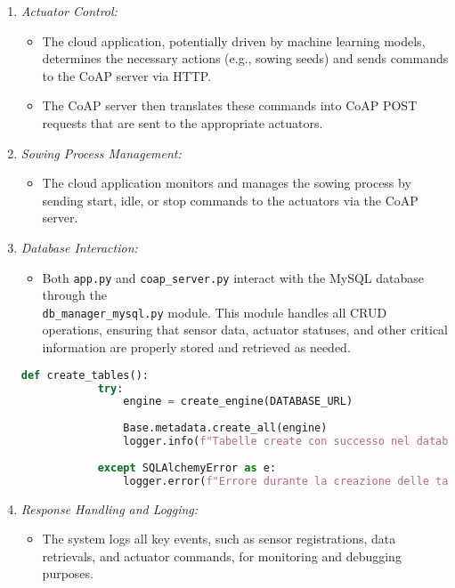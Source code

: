 \begin{enumerate}
    \item \textit{Actuator Control:} 
    \begin{itemize}
        \item The cloud application, potentially driven by machine learning models, determines the necessary actions (e.g., sowing seeds) and sends commands to the CoAP server via HTTP.
        \item The CoAP server then translates these commands into CoAP POST requests that are sent to the appropriate actuators. 
    \end{itemize}
    
    \item \textit{Sowing Process Management:} 
    \begin{itemize}
        \item The cloud application monitors and manages the sowing process by sending start, idle, or stop commands to the actuators via the CoAP server. 
    \end{itemize}
    
    \item \textit{Database Interaction:}
    \begin{itemize}
        \item Both \texttt{app.py} and \texttt{coap\_server.py} interact with the MySQL database through the\\
        \texttt{db\_manager\_mysql.py} module. This module handles all CRUD operations, ensuring that sensor data, actuator statuses, and other critical information are properly stored and retrieved as needed.
    \end{itemize}
    \begin{lstlisting}[language=Python]
        def create_tables():
            try:
                engine = create_engine(DATABASE_URL)
        
                Base.metadata.create_all(engine)
                logger.info(f"Tabelle create con successo nel database '{engine.url.database}'.")
        
            except SQLAlchemyError as e:
                logger.error(f"Errore durante la creazione delle tabelle: {str(e)}")


        \end{lstlisting}
    
    \item \textit{Response Handling and Logging:} 
    \begin{itemize}
        \item The system logs all key events, such as sensor registrations, data retrievals, and actuator commands, for monitoring and debugging purposes. 
    \end{itemize}
\end{enumerate}

